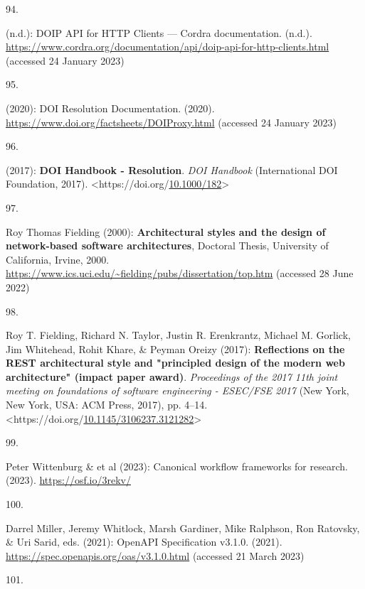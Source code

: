 \begin{thebibliography}{9}
\hypertarget{ref-DOIPAPIHTTPa}{}
94.

(n.d.): {DOIP API} for {HTTP Clients} --- {Cordra} documentation.
(n.d.).
\url{https://www.cordra.org/documentation/api/doip-api-for-http-clients.html}
(accessed 24 January 2023)

\hypertarget{ref-DOIResolutionDocumentation}{}
95.

(2020): {DOI Resolution Documentation}. (2020).
\url{https://www.doi.org/factsheets/DOIProxy.html} (accessed 24 January
2023)

\hypertarget{ref-DOIHandbookResolution}{}
96.

(2017): \textbf{{DOI Handbook} - {Resolution}}. \emph{{DOI Handbook}}
({International DOI Foundation}, 2017).
\textless https://doi.org/\href{https://doi.org/10.1000/182}{10.1000/182}\textgreater{}

\hypertarget{ref-fieldingArchitecturalStylesDesign2000a}{}
97.

Roy Thomas Fielding (2000): \textbf{Architectural styles and the design
of network-based software architectures}, Doctoral Thesis, {University
of California, Irvine}, 2000.
\url{https://www.ics.uci.edu/~fielding/pubs/dissertation/top.htm}
(accessed 28 June 2022)

\hypertarget{ref-fieldingReflectionsRESTArchitectural2017a}{}
98.

Roy T. Fielding, Richard N. Taylor, Justin R. Erenkrantz, Michael M.
Gorlick, Jim Whitehead, Rohit Khare, \& Peyman Oreizy (2017):
\textbf{Reflections on the {REST} architectural style and "principled
design of the modern web architecture" (impact paper award)}.
\emph{Proceedings of the 2017 11th joint meeting on foundations of
software engineering - {ESEC}/{FSE} 2017} ({New York, New York, USA}:
{ACM Press}, 2017), pp. 4--14.
\textless https://doi.org/\href{https://doi.org/10.1145/3106237.3121282}{10.1145/3106237.3121282}\textgreater{}

\hypertarget{ref-cwfr}{}
99.

Peter Wittenburg \& et al (2023): Canonical workflow frameworks for
research. (2023). \url{https://osf.io/3rekv/}

\hypertarget{ref-OpenAPISpecificationV3}{}
100.

Darrel Miller, Jeremy Whitlock, Marsh Gardiner, Mike Ralphson, Ron
Ratovsky, \& Uri Sarid, eds. (2021): {OpenAPI Specification} v3.1.0.
(2021). \url{https://spec.openapis.org/oas/v3.1.0.html} (accessed 21
March 2023)

\hypertarget{ref-SchemaOrgActions}{}
101.


\end{thebibliography}
